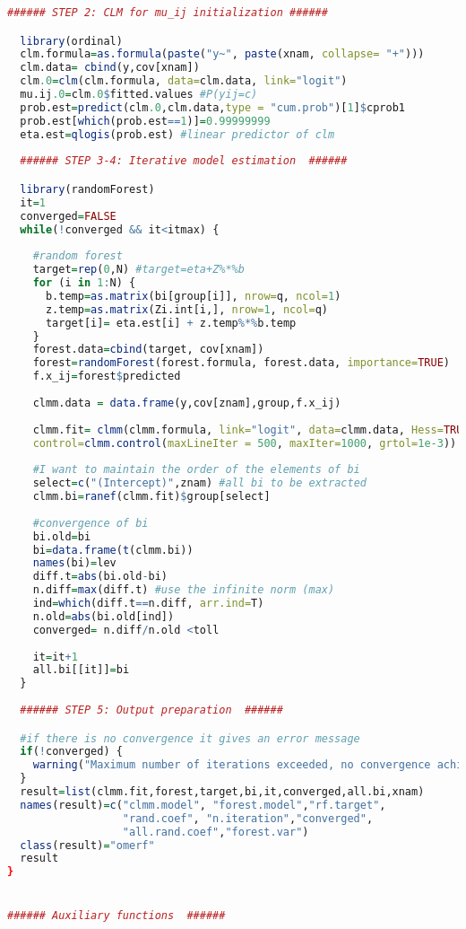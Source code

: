 \begin{lstlisting}[language=R]
  ###### STEP 2: CLM for mu_ij initialization ######

  library(ordinal)
  clm.formula=as.formula(paste("y~", paste(xnam, collapse= "+")))
  clm.data= cbind(y,cov[xnam])
  clm.0=clm(clm.formula, data=clm.data, link="logit")
  mu.ij.0=clm.0$fitted.values #P(yij=c)
  prob.est=predict(clm.0,clm.data,type = "cum.prob")[1]$cprob1
  prob.est[which(prob.est==1)]=0.99999999
  eta.est=qlogis(prob.est) #linear predictor of clm
  
  ###### STEP 3-4: Iterative model estimation  ######

  library(randomForest)
  it=1
  converged=FALSE
  while(!converged && it<itmax) {
    
    #random forest
    target=rep(0,N) #target=eta+Z%*%b
    for (i in 1:N) {
      b.temp=as.matrix(bi[group[i]], nrow=q, ncol=1)
      z.temp=as.matrix(Zi.int[i,], nrow=1, ncol=q)
      target[i]= eta.est[i] + z.temp%*%b.temp
    }
    forest.data=cbind(target, cov[xnam])
    forest=randomForest(forest.formula, forest.data, importance=TRUE) 
    f.x_ij=forest$predicted
    
    clmm.data = data.frame(y,cov[znam],group,f.x_ij)
    
    clmm.fit= clmm(clmm.formula, link="logit", data=clmm.data, Hess=TRUE, 
    control=clmm.control(maxLineIter = 500, maxIter=1000, grtol=1e-3))
    
    #I want to maintain the order of the elements of bi
    select=c("(Intercept)",znam) #all bi to be extracted
    clmm.bi=ranef(clmm.fit)$group[select]
    
    #convergence of bi
    bi.old=bi
    bi=data.frame(t(clmm.bi))
    names(bi)=lev
    diff.t=abs(bi.old-bi)
    n.diff=max(diff.t) #use the infinite norm (max)
    ind=which(diff.t==n.diff, arr.ind=T)
    n.old=abs(bi.old[ind])
    converged= n.diff/n.old <toll
    
    it=it+1
    all.bi[[it]]=bi
  }
 
  ###### STEP 5: Output preparation  ######

  #if there is no convergence it gives an error message
  if(!converged) {
    warning("Maximum number of iterations exceeded, no convergence achieved")
  }
  result=list(clmm.fit,forest,target,bi,it,converged,all.bi,xnam)
  names(result)=c("clmm.model", "forest.model","rf.target",
                  "rand.coef", "n.iteration","converged",
                  "all.rand.coef","forest.var")
  class(result)="omerf"
  result
}


###### Auxiliary functions  ######



\end{lstlisting}
